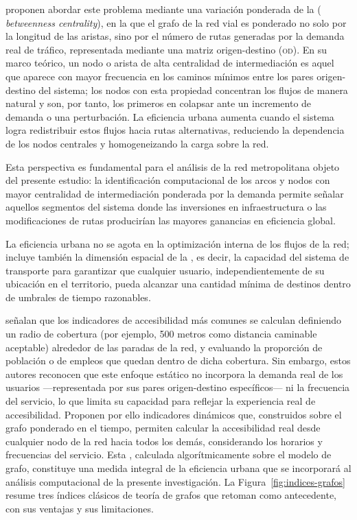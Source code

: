 \citet{batista2015} proponen abordar este problema mediante una variación
ponderada de la  (
\textit{betweenness centrality}), en la que el grafo de la red vial es ponderado
no solo por la longitud de las aristas, sino por el número de rutas generadas
por la demanda real de tráfico, representada mediante una matriz origen-destino
(\textsc{od}). En su marco teórico, un nodo o arista de alta centralidad de
intermediación es aquel que aparece con mayor frecuencia en los caminos mínimos
entre los pares origen-destino del sistema; los nodos con esta propiedad
concentran los flujos de manera natural y son, por tanto, los primeros en
colapsar ante un incremento de demanda o una perturbación. La eficiencia urbana
aumenta cuando el sistema logra redistribuir estos flujos hacia rutas
alternativas, reduciendo la dependencia de los nodos centrales y homogeneizando
la carga sobre la red.

Esta perspectiva es fundamental para el análisis de la red metropolitana objeto
del presente estudio: la identificación computacional de los arcos y nodos con
mayor centralidad de intermediación ponderada por la demanda permite señalar
aquellos segmentos del sistema donde las inversiones en infraestructura o las
modificaciones de rutas producirían las mayores ganancias en eficiencia global.

La eficiencia urbana no se agota en la optimización interna de los flujos de la
red; incluye también la dimensión espacial de la , es
decir, la capacidad del sistema de transporte para garantizar que cualquier
usuario, independientemente de su ubicación en el territorio, pueda alcanzar una
cantidad mínima de destinos dentro de umbrales de tiempo razonables.

\citet{fortin2016innovative} señalan que los indicadores de accesibilidad más
comunes se calculan definiendo un radio de cobertura (por ejemplo, 500 metros
como distancia caminable aceptable) alrededor de las paradas de la red, y
evaluando la proporción de población o de empleos que quedan dentro de dicha
cobertura. Sin embargo, estos autores reconocen que este enfoque estático no
incorpora la demanda real de los usuarios ---representada por sus pares
origen-destino específicos--- ni la frecuencia del servicio, lo que limita su
capacidad para reflejar la experiencia real de accesibilidad. Proponen por ello
indicadores dinámicos que, construidos sobre el grafo ponderado en el tiempo,
permiten calcular la accesibilidad real desde cualquier nodo de la red hacia
todos los demás, considerando los horarios y frecuencias del servicio. Esta
, calculada algorítmicamente sobre el modelo de
grafo, constituye una medida integral de la eficiencia urbana que se incorporará
al análisis computacional de la presente investigación. La
Figura~\ref{fig:indices-grafos} resume tres índices clásicos de teoría de
grafos que \citet{fortin2016innovative} retoman como antecedente, con sus
ventajas y sus limitaciones.

